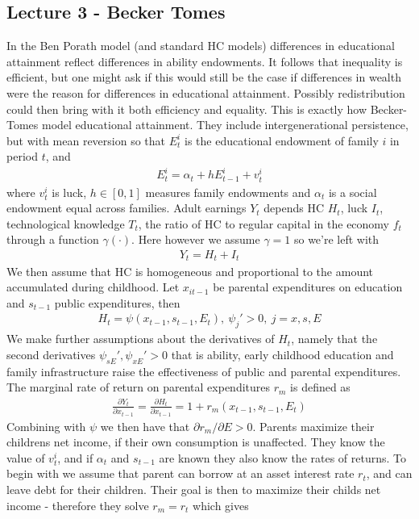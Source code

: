 \documentclass[12pt, a4paper]{article}
\begin{document}
\begin{multicols}{2}
\subsection{Lecture 3 - Becker Tomes}
In the Ben Porath model (and standard HC models) differences in educational attainment reflect differences in ability endowments. It follows that inequality is efficient, but one might ask if this would still be the case if differences in wealth were the reason for differences in educational attainment. Possibly redistribution could then bring with it both efficiency and equality. This is exactly how Becker-Tomes model educational attainment. They include intergenerational persistence, but with mean reversion so that $E_t^i$ is the educational endowment of family $i$ in period $t$, and
\begin{align*}
E_t^i = \alpha_t + h E_{t-1}^i + v_t^i
\end{align*}
where $v_t^i$ is luck, $h\in [0,1]$ measures family endowments and  $\alpha_t$ is a social endowment equal across families. Adult earnings $Y_t$ depends HC $H_t$, luck $I_t$, technological knowledge $T_t$, the ratio of HC to regular capital in the economy $f_t$ through a function $\gamma(\cdot)$. Here however we assume $\gamma = 1$ so we're left with
\begin{align*}
Y_t = H_{t} + I_t
\end{align*}
We then assume that HC is homogeneous and proportional to the amount accumulated during childhood. Let $x_{it-1}$ be parental expenditures on education and $s_{t-1}$ public expenditures, then
\begin{align*}
H_t = \psi (x_{t-1},s_{t-1},E_t), \ \psi_j' >0, \ j=x,s,E
\end{align*}
We make further assumptions about the derivatives of $H_t$, namely that the second derivatives $\psi_{sE}', \psi_{xE}'>0$ that is ability, early childhood education and family infrastructure raise the effectiveness of public and parental expenditures. The marginal rate of return on parental expenditures $r_m$ is defined as
\begin{align*}
\frac{\partial Y_t}{\partial x_{t-1}} = \frac{\partial H_t}{\partial x_{t-1}} = 1+ r_m(x_{t-1}, s_{t-1},E_t)
\end{align*}
Combining with $\psi$ we then have that $\partial r_m / \partial E>0$. Parents maximize their childrens net income, if their own consumption is unaffected. They know the value of $v_t^i$, and if $\alpha_t$ and $s_{t-1}$ are known they also know the rates of returns. To begin with we assume that parent can borrow at an asset interest rate $r_t$, and can leave debt for their children. Their goal is then to maximize their childs net income - therefore they solve $r_m=r_t$ which gives

\end{multicols}
\end{document}

